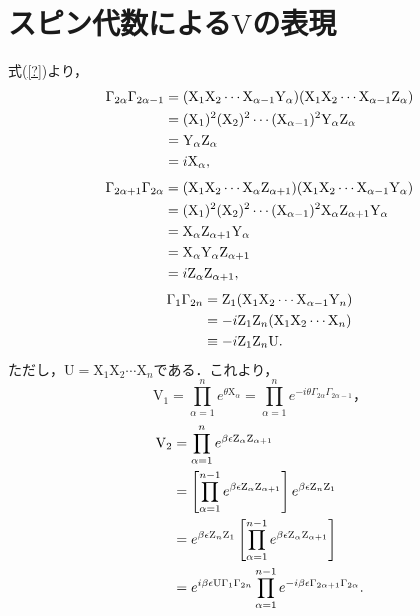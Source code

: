 \documentclass[a4paper,11pt]{jsreport}
\begin{document}
\section{スピン代数による$\mathrm{V}$の表現}
式(\ref{?})より，
\begin{align}
  \Gamma_{2\alpha}\Gamma_{2\alpha-1} 
  &= (\mathrm{X}_1 \mathrm{X}_2 \cdots \mathrm{X}_{\alpha-1} \mathrm{Y}_{\alpha}) (\mathrm{X}_1 \mathrm{X}_2 \cdots \mathrm{X}_{\alpha-1} \mathrm{Z}_{\alpha}) \notag \\
  &= (\mathrm{X}_1)^2 (\mathrm{X}_2)^2 \cdots (\mathrm{X}_{\alpha-1})^2 \mathrm{Y}_{\alpha} \mathrm{Z}_{\alpha} \notag \\
  &= \mathrm{Y}_{\alpha} \mathrm{Z}_{\alpha} \notag \\
  &= i \mathrm{X}_{\alpha},
\end{align}
\begin{align}
  \Gamma_{2\alpha+1}\Gamma_{2\alpha} 
  &= (\mathrm{X}_1 \mathrm{X}_2 \cdots \mathrm{X}_{\alpha} \mathrm{Z}_{\alpha+1}) (\mathrm{X}_1 \mathrm{X}_2 \cdots \mathrm{X}_{\alpha-1} \mathrm{Y}_{\alpha}) \notag \\
  &= (\mathrm{X}_1)^2 (\mathrm{X}_2)^2 \cdots (\mathrm{X}_{\alpha-1})^2 \mathrm{X}_{\alpha} \mathrm{Z}_{\alpha+1} \mathrm{Y}_{\alpha} \notag \\
  &= \mathrm{X}_{\alpha} \mathrm{Z}_{\alpha+1} \mathrm{Y}_{\alpha} \notag \\
  &= \mathrm{X}_{\alpha} \mathrm{Y}_{\alpha} \mathrm{Z}_{\alpha+1} \notag \\
  &= i \mathrm{Z}_{\alpha} \mathrm{Z}_{\alpha+1},
\end{align}
\begin{align}
  \Gamma_1\Gamma_{2n} 
  &= \mathrm{Z}_1 (\mathrm{X}_1 \mathrm{X}_2 \cdots \mathrm{X}_{\alpha-1} \mathrm{Y}_n) \notag \\
  &= -i \mathrm{Z}_1 \mathrm{Z}_n (\mathrm{X}_1 \mathrm{X}_2 \cdots \mathrm{X}_n) \notag \\
  &\equiv -i \mathrm{Z}_1 \mathrm{Z}_n \mathrm{U}.
\end{align}
ただし，$\mathrm{U}=\mathrm{X}_1\mathrm{X}_2\cdots\mathrm{X}_n$である．これより，
\begin{equation}
  \mathrm{V_1}
  = \prod_{\alpha=1}^{n} e^{\theta \mathrm{X}_{\alpha}}
  = \prod_{\alpha=1}^{n} e^{-i \theta \Gamma_{2\alpha} \Gamma_{2\alpha-1}}，
\end{equation}
\begin{align}
  \mathrm{V}_2
  &= \prod_{\alpha=1}^{n} e^{\beta \epsilon \mathrm{Z}_{\alpha} \mathrm{Z}_{\alpha+1}} \notag \\
  &= \left[ \prod_{\alpha=1}^{n-1} e^{\beta \epsilon \mathrm{Z}_{\alpha} \mathrm{Z}_{\alpha+1}} \right] e^{\beta \epsilon \mathrm{Z}_n \mathrm{Z}_1} \notag \\
  &= e^{\beta \epsilon \mathrm{Z}_n \mathrm{Z}_1} \left[ \prod_{\alpha=1}^{n-1} e^{\beta \epsilon \mathrm{Z}_{\alpha} \mathrm{Z}_{\alpha+1}} \right] \notag \\
  &= e^{i \beta \epsilon \mathrm{U} \Gamma_1 \Gamma_{2n}} \prod_{\alpha=1}^{n-1} e^{-i \beta \epsilon \Gamma_{2\alpha+1} \Gamma_{2\alpha}}.
\end{align}
\end{document}
